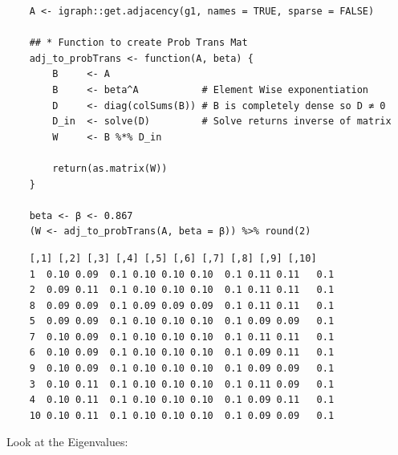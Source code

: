 \documentclass[11pt]{report}
\begin{document}
\begin{tcolorbox}
    \begin{verbatim}
    A <- igraph::get.adjacency(g1, names = TRUE, sparse = FALSE)

    ## * Function to create Prob Trans Mat
    adj_to_probTrans <- function(A, beta) {
        B     <- A
        B     <- beta^A           # Element Wise exponentiation
        D     <- diag(colSums(B)) # B is completely dense so D ≄ 0
        D_in  <- solve(D)         # Solve returns inverse of matrix
        W     <- B %*% D_in

        return(as.matrix(W))
    }

    beta <- β <- 0.867
    (W <- adj_to_probTrans(A, beta = β)) %>% round(2)
    \end{verbatim}
\tcblower
    \begin{verbatim}
    [,1] [,2] [,3] [,4] [,5] [,6] [,7] [,8] [,9] [,10]
    1  0.10 0.09  0.1 0.10 0.10 0.10  0.1 0.11 0.11   0.1
    2  0.09 0.11  0.1 0.10 0.10 0.10  0.1 0.11 0.11   0.1
    8  0.09 0.09  0.1 0.09 0.09 0.09  0.1 0.11 0.11   0.1
    5  0.09 0.09  0.1 0.10 0.10 0.10  0.1 0.09 0.09   0.1
    7  0.10 0.09  0.1 0.10 0.10 0.10  0.1 0.11 0.11   0.1
    6  0.10 0.09  0.1 0.10 0.10 0.10  0.1 0.09 0.11   0.1
    9  0.10 0.09  0.1 0.10 0.10 0.10  0.1 0.09 0.09   0.1
    3  0.10 0.11  0.1 0.10 0.10 0.10  0.1 0.11 0.09   0.1
    4  0.10 0.11  0.1 0.10 0.10 0.10  0.1 0.09 0.11   0.1
    10 0.10 0.11  0.1 0.10 0.10 0.10  0.1 0.09 0.09   0.1
    \end{verbatim}
\end{tcolorbox}

Look at the Eigenvalues:
\end{document}
